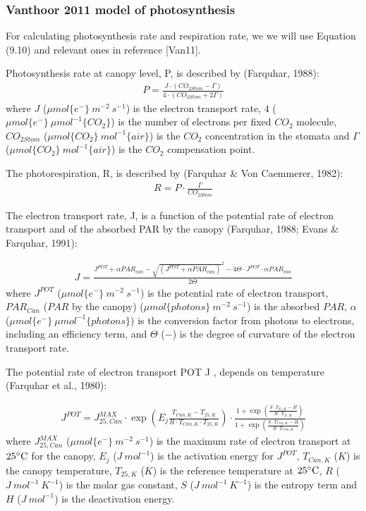 \documentclass[a4paper]{article}
\numberwithin{equation}{section}
\begin{document}
\subsubsection{Vanthoor 2011 model of photosynthesis}
For calculating photosynthesis rate and respiration rate, we we will use Equation (9.10) and relevant ones in reference [Van11].

Photosynthesis rate at canopy level, P, is described by (Farquhar, 1988):
\begin{align}
  P = \frac{J \cdot (CO_{2Stom} - \Gamma)}{4 \cdot (CO_{2Stom} + 2\Gamma)}
\end{align}
where \(J\) (\(\mu mol\{e^-\}\ m^{-2}\ s^{-1}\)) is the electron transport rate, \(4\) (\(\mu mol \{e^-\}\ \mu mol^{-1} \{CO_2\}\)) is the number of electrons per fixed \(CO_2\) molecule, \(CO_{2Stom}\) (\(\mu mol\{CO_2\}\ mol^{-1}\{air\}\)) is the \(CO_2\) concentration in the stomata and \(\Gamma\) (\(\mu mol \{CO_2\}\ mol^{-1} \{air\}\)) is the \(CO_2\) compensation point.

The photorespiration, R, is described by (Farquhar \& Von Caemmerer, 1982):
\begin{align}
  R = P \cdot \frac{\Gamma}{CO_{2Stom}} 
\end{align}

The electron transport rate, J, is a function of the potential rate of electron transport and of the absorbed PAR by the canopy (Farquhar, 1988; Evans \& Farquhar, 1991):

\begin{align}
  J = \frac{J^{POT} + \alpha PAR_{can} - {\sqrt{(J^{POT} + \alpha PAR_{can})}^2 - 4\Theta\cdot J^{POT}\cdot \alpha PAR_{can}}}{2 \Theta}
\end{align}
where \(J^{POT}\) (\(\mu mol\{e^-\}\ m^{-2}\ s^{-1}\)) is the potential rate of electron transport, \(PAR_{Can}\) (\(PAR\) by the canopy) (\(\mu mol\{photons\}\ m^{-2}\ s^{-1}\)) is the absorbed \(PAR\), \(\alpha\) (\(\mu mol\{e^-\}\ \mu mol^{-1}\{photons\}\)) is the conversion factor from photons to electrons, including an efficiency term, and \(\Theta\) (\(-\)) is the degree of curvature of the electron transport rate.

The potential rate of electron transport POT J , depends on temperature (Farquhar et al., 1980):

\begin{align}
  J^{POT} = J^{MAX}_{25,Can} \cdot \exp \left(E_j\frac{T_{Can,K}-T_{25,K}}{R\cdot T_{Can,K}\cdot T_{25,K}}\right) \cdot \frac{1 + \exp \left(\frac{S\cdot T_{25,K}-H}{R\cdot T_{25,K}}\right)}{1 + \exp \left(\frac{S\cdot T_{Can,K}-H}{R\cdot T_{Can,K}}\right)}
\end{align}
where \(J^{MAX}_{25,Can}\) (\(\mu mol \{e^-\}\ m^{-2}\ s^{-1}\)) is the maximum rate of electron transport at \(25 \celsius\) for the canopy, \(E_j\) (\(J\ mol^{-1}\)) is the activation energy for \(J^{POT}\), \(T_{Can,K}\) (\(K\)) is the canopy temperature, \(T_{25,K}\) (\(K\)) is the reference temperature at \(25 \celsius\), \(R\) (\(J\ mol^{-1}\ K^{-1}\)) is the molar gas constant, \(S\) (\(J\ mol^{-1}\ K^{-1}\)) is the entropy term and \(H\) (\(J\ mol^{-1}\)) is the deactivation energy.
\end{document}

